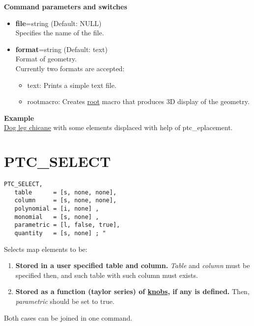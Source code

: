 {\bf Command parameters and switches}
\begin{itemize}
   \item {\bf file}=string (Default: NULL)\\
     Specifies the name of the file.   
   \item {\bf format}=string (Default: text)\\
     Format of geometry.\\
     Currently two formats are accepted:       
     \begin{itemize}
	\item text: Prints a simple text file.           
	\item rootmacro: Creates \href{http://root.cern.ch}{root} macro
          that produces 3D display of the geometry.            
     \end{itemize}
\end{itemize}


{\bf Example }\\
\href{http://cern.ch/frs/mad-X_examples/ptc_madx_interface/eplacement/eplacement.madx}{Dog
  leg chicane} with some elements displaced with help of
ptc\_eplacement.

 
% 


%

\section{PTC\_SELECT}

\begin{verbatim}
PTC_SELECT, 
   table      = [s, none, none], 
   column     = [s, none, none], 
   polynomial = [i, none] , 
   monomial   = [s, none] , 
   parametric = [l, false, true], 
   quantity   = [s, none] ; "
\end{verbatim}


Selects map elements to be: 
\begin{enumerate}
  \item {\bf Stored in a user specified table and column.}
    \textit{Table} and \textit{column} must be specified then, and such
    table with such column must exists.  

  \item {\bf Stored as a function (taylor series) of
    \href{PTC_Knob.html}{knobs}, if any is defined.} Then,
    \textit{parametric} should be set to true. 
\end{enumerate}
Both cases can be joined in one command.   


